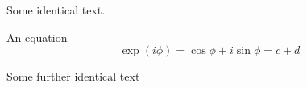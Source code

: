\documentclass{article}
\begin{document}
Some identical text.

An equation
\begin{displaymath}
\exp(i\phi)=\cos \phi + i \sin \phi = c + d
\end{displaymath}

Some further identical text
\end{document}
